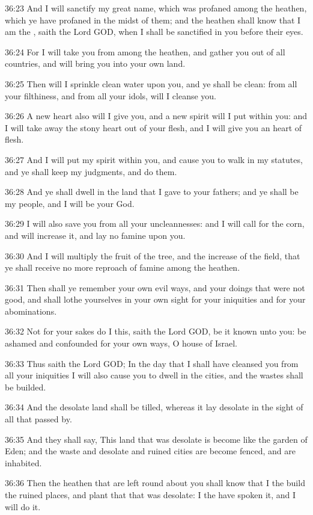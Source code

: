 36:23 And I will sanctify my great name, which was profaned among the
heathen, which ye have profaned in the midst of them; and the heathen
shall know that I am the \LORD, saith the Lord GOD, when I shall be
sanctified in you before their eyes.

36:24 For I will take you from among the heathen, and gather you out
of all countries, and will bring you into your own land.

36:25 Then will I sprinkle clean water upon you, and ye shall be
clean: from all your filthiness, and from all your idols, will I
cleanse you.

36:26 A new heart also will I give you, and a new spirit will I put
within you: and I will take away the stony heart out of your flesh,
and I will give you an heart of flesh.

36:27 And I will put my spirit within you, and cause you to walk in my
statutes, and ye shall keep my judgments, and do them.

36:28 And ye shall dwell in the land that I gave to your fathers; and
ye shall be my people, and I will be your God.

36:29 I will also save you from all your uncleannesses: and I will
call for the corn, and will increase it, and lay no famine upon you.

36:30 And I will multiply the fruit of the tree, and the increase of
the field, that ye shall receive no more reproach of famine among the
heathen.

36:31 Then shall ye remember your own evil ways, and your doings that
were not good, and shall lothe yourselves in your own sight for your
iniquities and for your abominations.

36:32 Not for your sakes do I this, saith the Lord GOD, be it known
unto you: be ashamed and confounded for your own ways, O house of
Israel.

36:33 Thus saith the Lord GOD; In the day that I shall have cleansed
you from all your iniquities I will also cause you to dwell in the
cities, and the wastes shall be builded.

36:34 And the desolate land shall be tilled, whereas it lay desolate
in the sight of all that passed by.

36:35 And they shall say, This land that was desolate is become like
the garden of Eden; and the waste and desolate and ruined cities are
become fenced, and are inhabited.

36:36 Then the heathen that are left round about you shall know that I
the \LORD build the ruined places, and plant that that was desolate: I
the \LORD have spoken it, and I will do it.


